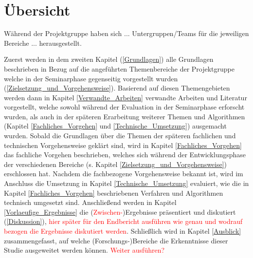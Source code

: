 \section{Übersicht}

Während der Projektgruppe haben sich ... Untergruppen/Teams für die jeweiligen Bereiche ... herausgestellt.

Zuerst werden in dem zweiten Kapitel (\ref{Grundlagen}) alle Grundlagen beschrieben in Bezug auf die angeführten Themenbereiche der Projektgruppe welche in der Seminarphase gegenseitig vorgestellt wurden (\ref{Zielsetzung_und_Vorgehensweise}). Basierend auf diesen Themengebieten werden dann in Kapitel \ref{Verwandte_Arbeiten} verwandte Arbeiten und Literatur vorgestellt, welche sowohl während der Evaluation in der Seminarphase erforscht wurden, als auch in der späteren Erarbeitung weiterer Themen und Algorithmen (Kapitel \ref{Fachliches_Vorgehen} und \ref{Technische_Umsetzung}) ausgemacht wurden. Sobald die Grundlagen über die Themen der späteren fachlichen und technischen Vorgehensweise geklärt sind, wird in Kapitel \ref{Fachliches_Vorgehen} das fachliche Vorgehen beschrieben, welches sich während der Entwicklungsphase der verschiedenen Bereiche (s. Kapitel \ref{Zielsetzung_und_Vorgehensweise}) erschlossen hat. Nachdem die fachbezogene Vorgehensweise bekannt ist, wird im Anschluss die Umsetzung in Kapitel \ref{Technische_Umsetzung} evaluiert, wie die in Kapitel \ref{Fachliches_Vorgehen} beschriebenen Verfahren und Algorithmen technisch umgesetzt sind. Anschließend werden in Kapitel \ref{Vorlaeufige_Ergebnisse} die (\textcolor{red}{Zwischen-})Ergebnisse präsentiert und diskutiert (\ref{Diskussion}), \textcolor{red}{hier später für den Endbericht ausführen wie genau und wodrauf bezogen die Ergebnisse diskutiert werden}. Schließlich wird in Kapitel \ref{Ausblick} zusammengefasst, auf welche (Forschungs-)Bereiche die Erkenntnisse dieser Studie ausgeweitet werden können. \textcolor{red}{Weiter ausführen?}